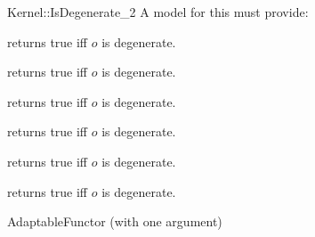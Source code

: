 \begin{ccRefFunctionObjectConcept}{Kernel::IsDegenerate_2}
A model for this must provide:


{returns true iff $o$ is degenerate.}

{returns true iff $o$ is degenerate.}

{returns true iff $o$ is degenerate.}

{returns true iff $o$ is degenerate.}

{returns true iff $o$ is degenerate.}

{returns true iff $o$ is degenerate.}

\ccRefines
AdaptableFunctor (with one argument)

\ccSeeAlso
{} \\
 \\
 \\
 \\
 \\
 \\


\end{ccRefFunctionObjectConcept}
